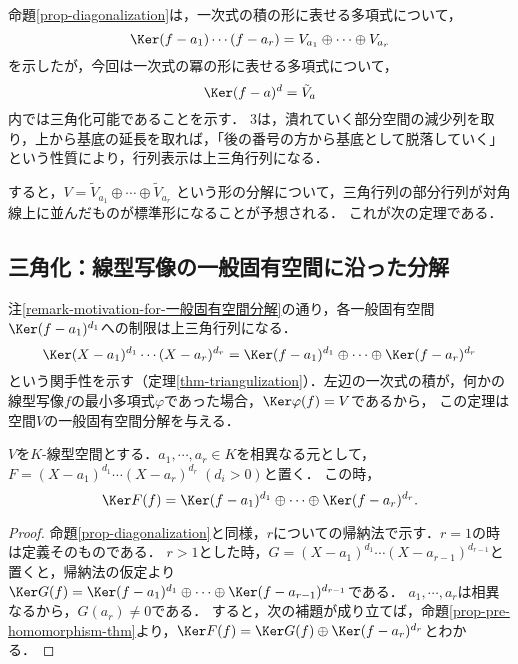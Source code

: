 \documentclass[uplatex, dvipdfmx]{jsreport}
\begin{document}
\begin{remark}\label{remark-motivation-for-一般固有空間分解}
    命題\ref{prop-diagonalization}は，一次式の積の形に表せる多項式について，
    \[ \Ker(f-a_1)\cdots(f-a_r)=V_{a_1}\oplus\cdots\oplus V_{a_r} \]
    を示したが，今回は一次式の冪の形に表せる多項式について，
    \[ \Ker(f-a)^d=\tilde{V}_a \]
    内では三角化可能であることを示す．
    3は，潰れていく部分空間の減少列を取り，上から基底の延長を取れば，「後の番号の方から基底として脱落していく」という性質により，行列表示は上三角行列になる．

    すると，$V=\tilde{V}_{a_1}\oplus\cdots\oplus\tilde{V}_{a_r}$
    という形の分解について，三角行列の部分行列が対角線上に並んだものが標準形になることが予想される．
    これが次の定理である．
\end{remark}

\subsection{三角化：線型写像の一般固有空間に沿った分解}

\begin{tcolorbox}[colframe=ForestGreen, colback=ForestGreen!10!white, breakable]
    注\ref{remark-motivation-for-一般固有空間分解}の通り，各一般固有空間$\Ker(f-a_1)^{d_1}$への制限は上三角行列になる．
    \[\Ker(X-a_1)^{d_1}\cdots(X-a_r)^{d_r}=\Ker(f-a_1)^{d_1}\oplus\cdots\oplus\Ker(f-a_r)^{d_r}\]
    という関手性を示す（定理\ref{thm-triangulization}）．左辺の一次式の積が，何かの線型写像$f$の最小多項式$\varphi$であった場合，$\Ker\varphi(f)=V$であるから，
    この定理は空間$V$の一般固有空間分解を与える．
\end{tcolorbox}

\begin{theorem}[三角化]\label{thm-triangulization}
    $V$を$K$-線型空間とする．$a_1,\cdots,a_r\in K$を相異なる元として，$F=(X-a_1)^{d_1}\cdots(X-a_r)^{d_r}\;(d_i>0)$と置く．
    この時，
    \[ \Ker F(f)=\Ker(f-a_1)^{d_1}\oplus\cdots\oplus\Ker(f-a_r)^{d_r}. \]
\end{theorem}
\begin{proof}
    命題\ref{prop-diagonalization}と同様，$r$についての帰納法で示す．$r=1$の時は定義そのものである．
    $r>1$とした時，$G=(X-a_1)^{d_1}\cdots(X-a_{r-1})^{d_{r-1}}$と置くと，帰納法の仮定より$\Ker G(f)=\Ker(f-a_1)^{d_1}\oplus\cdots\oplus\Ker(f-a_{r-1})^{d_{r-1}}$である．
    $a_1,\cdots,a_r$は相異なるから，$G(a_r)\ne 0$である．
    すると，次の補題が成り立てば，命題\ref{prop-pre-homomorphism-thm}より，$\Ker F(f)=\Ker G(f)\oplus\Ker(f-a_r)^{d_r}$とわかる．
\end{proof}
\end{document}
